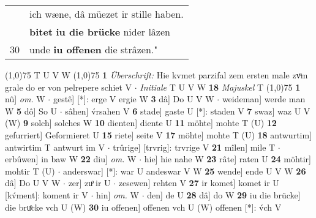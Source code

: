 \documentclass[8pt,a4paper,notitlepage]{article}
\begin{document}
\begin{table}[ht]
\begin{minipage}[t]{0.5\linewidth}
\begin{tabular}{rl}
 & ich wæne, dâ müezet ir stille haben.\\ 
 & \textbf{bitet} \textbf{iu die brücke} nider lâzen\\ 
30 & unde \textbf{iu offenen} die strâzen."\\ 
\end{tabular}
\scriptsize
\line(1,0){75} \newline
T U V W \newline
\line(1,0){75} \newline
\textbf{1} \textit{Überschrift:} Hie kvmet parzifal zem ersten male zvͦm grale do er von pelrepere schiet V   $\cdot$ \textit{Initiale} T U V W  \textbf{18} \textit{Majuskel} T  \newline
\line(1,0){75} \newline
\textbf{1} nû] \textit{om.} W  $\cdot$ gestê] [*]: erge V ergie W \textbf{3} dâ] Do U V W  $\cdot$ weideman] werde man W \textbf{5} dô] So U  $\cdot$ sâhen] v́rsahen V \textbf{6} stade] gaste U [*]: staden V \textbf{7} swaz] waz U V (W) \textbf{9} solch] solches W \textbf{10} dienten] diente U \textbf{11} möhte] mohte T (U) \textbf{12} gefurriert] Geformieret U \textbf{15} riete] seite V \textbf{17} möhte] mohte T (U) \textbf{18} antwurtim] antwirtim T antwurt im V  $\cdot$ trûrige] [trvrig]: trvrige V \textbf{21} mîlen] mile T  $\cdot$ erbûwen] in baw W \textbf{22} diu] \textit{om.} W  $\cdot$ hie] hie nahe W \textbf{23} râte] raten U \textbf{24} möhtir] mohtir T (U)  $\cdot$ anderswar] [*]: war U andeswar V W \textbf{25} wende] ende U V W \textbf{26} dâ] Do U V W  $\cdot$ zer] zuͦ ir U  $\cdot$ zesewen] rehten V \textbf{27} ir komet] komet ir U [kv́ment]: koment ir V  $\cdot$ hin] \textit{om.} W  $\cdot$ den] de U \textbf{28} dâ] do W \textbf{29} iu die brücke] die bruͦcke vch U (W) \textbf{30} iu offenen] offenen vch U (W) offenen [*]: v́ch  V \newline
\end{minipage}
\end{table}
\end{document}
